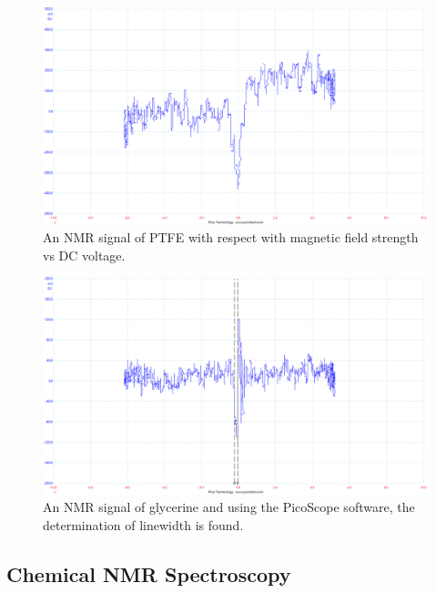 \documentclass[12pt]{article}
\begin{document}
\begin{figure}[H]
\centering
\includegraphics[scale=0.45]{Images/Report/Part A/4B.png}
\caption{An NMR signal of PTFE with respect with magnetic field strength vs DC voltage.}
\label{Part 1 4B}
\end{figure}

\begin{figure}[H]
\centering
\includegraphics[scale=0.45]{Images/Report/Part A/Linewidth.png}
\caption{An NMR signal of glycerine and using the PicoScope software, the determination of linewidth is found.}
\label{Linewidth}
\end{figure}

\subsection{Chemical NMR Spectroscopy}
\label{Chemical NMR Spectroscopy SubSection}
\end{document}
